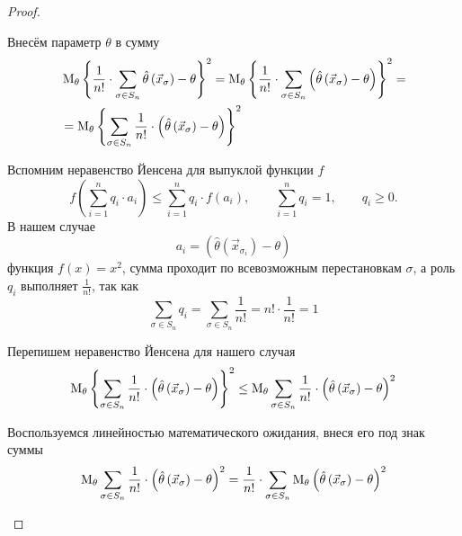 \begin{proof}
\begin{enumerate}
      Внесём параметр $\theta$ в сумму
      \begin{align*}
        &\operatorname{M}_{\theta} \left\{ \frac{1}{n!} \cdot \sum_{\sigma\in S_n}
          \hat{\theta}\left( \vec{x}_\sigma \right) - \theta \right\}^2
        = \operatorname{M}_{\theta} 
          \left\{ \frac{1}{n!}\cdot \sum_{\sigma\in S_n}
          \left( \hat{\theta}\left( \vec{x}_\sigma \right)
            - \theta \right) \right\}^2 = \\
        &= \operatorname{M}_{\theta} 
          \left\{ \sum_{\sigma\in S_n}\frac{1}{n!}
            \cdot \left( \hat{\theta}\left(\vec{x}_\sigma \right)
              -\theta \right) \right\}^2
      \end{align*}

      Вспомним неравенство Йенсена для выпуклой функции $f$
      \cite[с.~167]{DorogovtsevMA}
      \begin{equation*}
        f\left( \sum_{i=1}^n q_i \cdot a_i \right)
          \le \sum_{i=1}^n q_i \cdot f\left( a_i \right),\qquad
        \sum_{i=1}^n q_i=1,\qquad
        q_i \ge 0.
      \end{equation*} 
      В нашем случае
      \begin{equation*}
        a_i = \left( \hat{\theta}\left( \vec{x}_{\sigma_i} \right)
            - \theta \right)
      \end{equation*}
      функция $f\left(x\right)=x^2$,
      сумма проходит по всевозможным перестановкам $\sigma$,
      а роль $q_i$ выполняет $\frac{1}{n!}$,
      так как
      \begin{equation*}
        \sum_{\sigma\in S_n} q_i
        = \sum_{\sigma\in S_n}\frac{1}{n!}
        = n! \cdot \frac{1}{n!}
        = 1
      \end{equation*}

      Перепишем неравенство Йенсена для нашего случая
      \begin{equation}\label{eq:jensen_symmetrization}
          \operatorname{M}_{\theta} \left\{\sum_{\sigma\in S_n}\frac{1}{n!}\cdot
        \left(\hat{\theta}\left(\vec{x}_\sigma\right)
        -\theta\right)\right\}^2
        \le\operatorname{M}_{\theta} \sum_{\sigma\in S_n}\frac{1}{n!}\cdot
            \left(\hat{\theta}\left(\vec{x}_\sigma\right)
            -\theta\right)^2
      \end{equation}

      Воспользуемся линейностью математического ожидания,
      внеся его под знак суммы
      \begin{align*}
        \operatorname{M}_{\theta} \sum_{\sigma\in S_n}\frac{1}{n!}
          \cdot\left( \hat{\theta}\left( \vec{x}_\sigma \right)
            -\theta \right)^2
        = \frac{1}{n!}\cdot \sum_{\sigma\in S_n} \operatorname{M}_{\theta} 
            \left( \hat{\theta}\left( \vec{x}_\sigma \right)
            -\theta \right)^2
      \end{align*}


\end{enumerate}
\end{proof}
